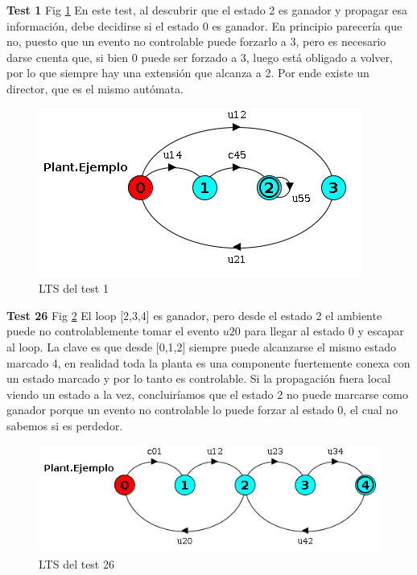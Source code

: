 \textbf{Test 1} Fig \ref{fig:test1}
En este test, al descubrir que el estado 2 es ganador y propagar esa información, debe decidirse si el estado 0 es ganador. En principio parecería que no, puesto que un evento no controlable puede forzarlo a 3, pero es necesario darse cuenta que, si bien 0 puede ser forzado a 3, luego está obligado a volver, por lo que siempre hay una extensión que alcanza a 2. Por ende existe un director, que es el mismo autómata.
\begin{figure}[h]
 \centering
 \includegraphics[scale=0.7]{figures/tests/test1.png}
 \caption{LTS del test 1}
 \label{fig:test1}
\end{figure}


\FloatBarrier
\textbf{Test 26} Fig \ref{fig:test26} 
El loop [2,3,4] es ganador, pero desde el estado 2 el ambiente puede no controlablemente tomar el evento $u20$ para llegar al estado 0 y escapar al loop. La clave es que desde [0,1,2] siempre puede alcanzarse el mismo estado marcado 4, en realidad toda la planta es una componente fuertemente conexa con un estado marcado y por lo tanto es controlable. 
Si la propagación fuera local viendo un estado a la vez, concluiríamos que el estado 2 no puede marcarse como ganador porque un evento no controlable lo puede forzar al estado 0, el cual no sabemos si es perdedor.

\begin{figure}[h]
 \centering
 \includegraphics[scale=0.7]{figures/tests/test26.png}
 \caption{LTS del test 26}
 \label{fig:test26}
\end{figure}

